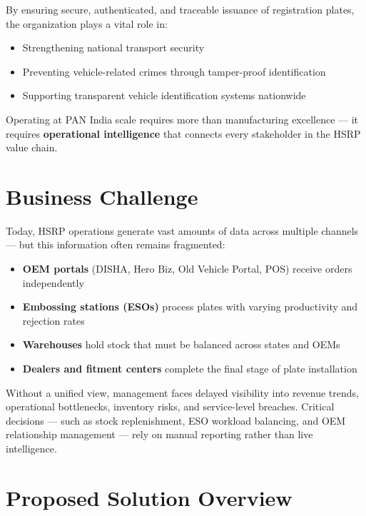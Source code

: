 \documentclass[11pt,a4paper]{article}
\begin{document}
By ensuring secure, authenticated, and traceable issuance of registration plates, the organization plays a vital role in:
\begin{itemize}[leftmargin=1.5em, itemsep=0.2em]
    \item Strengthening national transport security
    \item Preventing vehicle-related crimes through tamper-proof identification
    \item Supporting transparent vehicle identification systems nationwide
\end{itemize}

Operating at PAN India scale requires more than manufacturing excellence --- it requires \textbf{operational intelligence} that connects every stakeholder in the HSRP value chain.

\section{Business Challenge}

Today, HSRP operations generate vast amounts of data across multiple channels --- but this information often remains fragmented:

\begin{itemize}[leftmargin=1.5em, itemsep=0.3em]
    \item \textbf{OEM portals} (DISHA, Hero Biz, Old Vehicle Portal, POS) receive orders independently
    \item \textbf{Embossing stations (ESOs)} process plates with varying productivity and rejection rates
    \item \textbf{Warehouses} hold stock that must be balanced across states and OEMs
    \item \textbf{Dealers and fitment centers} complete the final stage of plate installation
\end{itemize}

Without a unified view, management faces delayed visibility into revenue trends, operational bottlenecks, inventory risks, and service-level breaches. Critical decisions --- such as stock replenishment, ESO workload balancing, and OEM relationship management --- rely on manual reporting rather than live intelligence.

\section{Proposed Solution Overview}
\end{document}

